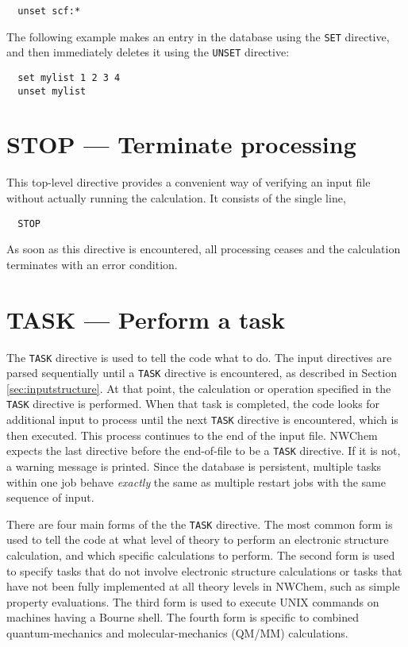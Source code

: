 \begin{verbatim}
  unset scf:*
\end{verbatim}

The following example makes an entry in the database using the
\verb+SET+ directive, and then immediately deletes it using the
\verb+UNSET+ directive:

\begin{verbatim}
  set mylist 1 2 3 4
  unset mylist
\end{verbatim}


\section{STOP --- Terminate processing}

This top-level directive provides a convenient way of verifying 
an input file without actually running the calculation.  It consists 
of the single line,

\begin{verbatim}
  STOP
\end{verbatim}

As soon as this directive is encountered, all processing ceases and
the calculation terminates with an error condition.

\section{TASK --- Perform a task}
\label{sec:task}

The \verb+TASK+ directive is used to tell the code what to do.  The
input directives are parsed sequentially until a \verb+TASK+ directive
is encountered, as described in Section \ref{sec:inputstructure}.  At
that point, the calculation or operation specified in the \verb+TASK+
directive is performed.  When that task is completed, the code looks
for additional input to process until the next \verb+TASK+ directive
is encountered, which is then executed.  This process continues to the
end of the input file.  NWChem expects the last directive before the
end-of-file to be a \verb+TASK+ directive.  If it is not, a warning
message is printed.  Since the database is persistent, multiple tasks
within one job behave {\em exactly} the same as multiple restart jobs
with the same sequence of input.

There are four main forms of the the \verb+TASK+ directive.  The most
common form is used to tell the code at what level of theory to
perform an electronic structure calculation, and which specific
calculations to perform.  The second form is used to specify tasks
that do not involve electronic structure calculations or tasks that
have not been fully implemented at all theory levels in NWChem, such
as simple property evaluations.  The third form is used to execute
UNIX commands on machines having a Bourne shell.  The fourth form is
specific to combined quantum-mechanics and molecular-mechanics (QM/MM)
calculations.


